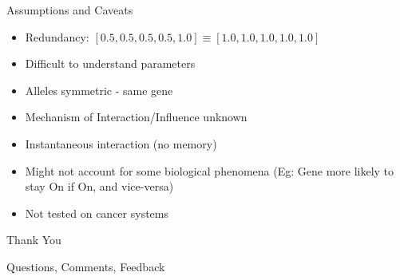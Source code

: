 \documentclass[aspectratio=169,9pt]{beamer}
\begin{document}
\begin{frame}{Assumptions and Caveats}
  \begin{itemize}
    \item \pause[2] Redundancy: $[0.5,0.5,0.5,0.5,1.0] \equiv [1.0,1.0,1.0,1.0,1.0]$
    \item \pause[2] Difficult to understand parameters
    \item Alleles symmetric - same gene
    \item \pause Mechanism of Interaction/Influence unknown
    \item \pause Instantaneous interaction (no memory)
    \item \pause Might not account for some biological phenomena (Eg: Gene more likely to stay On if On, and vice-versa)
    \item \pause Not tested on cancer systems
  \end{itemize}
\end{frame}

\begin{frame}[standout]
  Thank You

  Questions, Comments, Feedback
\end{frame}

\begin{frame}[allowframebreaks]
  \printbibliography
\end{frame}
\end{document}
